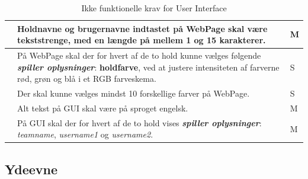 \documentclass[Kravspecifikation/Kravspec_Main.tex]{subfiles}
\begin{document}
\begin{table}[H]
\begin{tabular}{|L{0.1\textwidth}|L{0.65\textwidth}|L{0.15\textwidth}|}
\subreq{} \label{req:webpage-string-length} & Holdnavne og brugernavne indtastet på WebPage skal være tekststrenge, med en længde på mellem 1 og 15 karakterer. & M\\ \hline
\subreq{} \label{req:webpage-color-select} & På WebPage skal der for hvert af de to hold kunne vælges følgende \textit{\textbf{spiller oplysninger}}: \textbf{holdfarve}, ved at justere intensiteten af farverne rød, grøn og blå i et RGB farveskema. & S\\ \hline
\subreq{} \label{req:webpage-color-size} & Der skal kunne vælges mindst 10 forskellige farver på WebPage. & S\\ \hline
\subreq{} \label{req:GUI-language}& Alt tekst på GUI skal være på sproget engelsk. & M \\ \hline
\subreq{} \label{req:GUI-info-type} & På GUI skal der for hvert af de to hold vises \textit{\textbf{spiller oplysninger}}: \textit{teamname}, \textit{username1} og \textit{username2}. & M\\ \hline
\end{tabular}
\caption{Ikke funktionelle krav for User Interface}
\label{tab:user_interface}
\end{table}

\subsection{Ydeevne}
\end{document}
